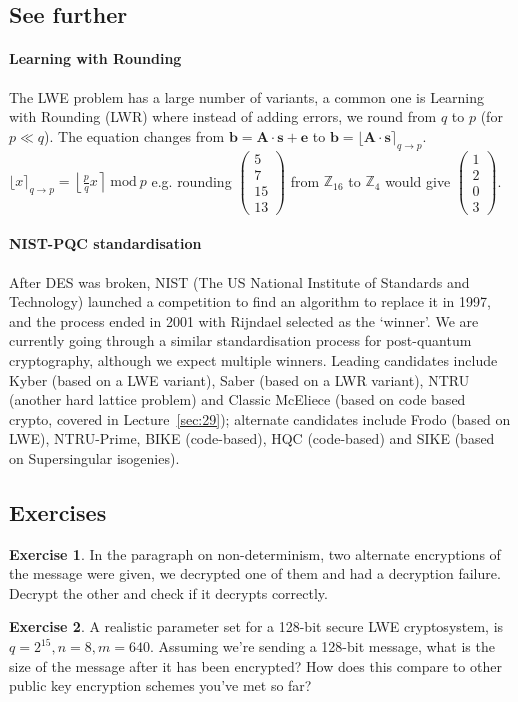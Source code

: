 \documentclass[a4paper, 11pt, openany]{book}
\numberwithin{equation}{section}
\theoremstyle{plain}
\theoremstyle{definition}
\newtheorem{exercise}   {Exercise}  [section]
\begin{document}
\subsection{See further}
\paragraph{Learning with Rounding} The LWE problem has a large number of variants, a common one is Learning with Rounding (LWR) where instead of adding errors, we round from $q$ to $p$ (for $p \ll q$). The equation changes from $\textbf{b} = \textbf{A}\cdot\textbf{s} + \textbf{e}$ to $\textbf{b} = \lfloor\textbf{A}\cdot\textbf{s}\rceil_{q\rightarrow p}$.
\\
$\lfloor x \rceil_{q\rightarrow p} = \left\lfloor\frac{p}{q}x\right\rceil~\text{mod}~p$  e.g. rounding $\begin{pmatrix}5\\7\\15\\13\end{pmatrix}$ from  $\mathbb{Z}_{16}$ to  $\mathbb{Z}_{4}$ would give $\begin{pmatrix}1\\2\\0\\3\end{pmatrix}$.
\paragraph{NIST-PQC standardisation}
After DES was broken, NIST (The US National Institute of Standards and Technology) launched a competition to find an algorithm to replace it in 1997, and the process ended in 2001 with Rijndael selected as the `winner'. We are currently going through a similar standardisation process for post-quantum cryptography, although we expect multiple winners. Leading candidates include Kyber (based on a LWE variant), Saber (based on a LWR variant), NTRU (another hard lattice problem) and Classic McEliece (based on code based crypto, covered in Lecture~\ref{sec:29}); alternate candidates include Frodo (based on LWE), NTRU-Prime, BIKE (code-based), HQC (code-based) and SIKE (based on Supersingular isogenies).
\subsection{Exercises} 
\begin{exercise}
	In the paragraph on non-determinism, two alternate encryptions of the message were given, we decrypted one of them and had a decryption failure. Decrypt the other and check if it decrypts correctly. 
\end{exercise}
\begin{exercise}
	A realistic parameter set for a 128-bit secure LWE cryptosystem, is $q = 2^{15}, n = 8, m = 640$. Assuming we're sending a 128-bit message, what is the size of the message after it has been encrypted? How does this compare to other public key encryption schemes you've met so far?
\end{exercise}
\end{document}
